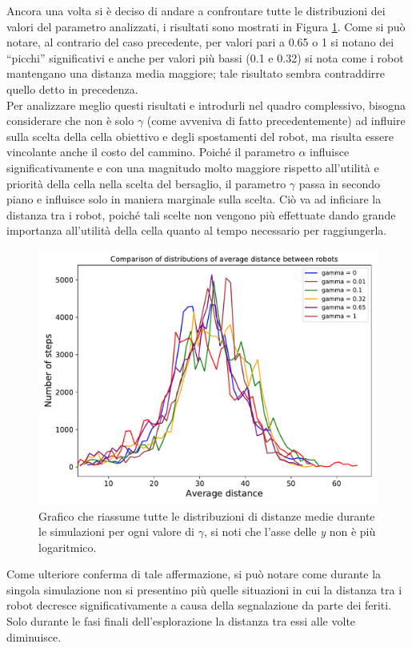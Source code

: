 Ancora una volta si è deciso di andare a confrontare tutte le distribuzioni dei valori del parametro analizzati, i risultati sono mostrati in Figura \ref{fig:gammaHComparison}.
Come si può notare, al contrario del caso precedente, per valori pari a 0.65 o 1 si notano dei “picchi” significativi e anche per valori più bassi (0.1 e 0.32) si nota come i robot mantengano una distanza media maggiore; tale risultato sembra contraddirre quello detto in precedenza.\\
Per analizzare meglio questi risultati e introdurli nel quadro complessivo, bisogna considerare che non è solo $\gamma$ (come avveniva di fatto precedentemente) ad influire sulla scelta della cella obiettivo e degli spostamenti del robot, ma risulta essere vincolante anche il costo del cammino. 
Poiché il parametro $\alpha$ influisce significativamente e con una magnitudo molto maggiore rispetto all'utilità e priorità della cella nella scelta del bersaglio, il parametro $\gamma$ passa in secondo piano e influisce solo in maniera marginale sulla scelta. Ciò va ad inficiare la distanza tra i robot, poiché tali scelte non vengono più effettuate dando grande importanza all'utilità della cella quanto al tempo necessario per raggiungerla.
\begin{figure}
	\centering
	\includegraphics[width=0.9\linewidth]{images/gamma_results/high_alpha/comparison}
	\caption{Grafico che riassume tutte le distribuzioni di distanze medie durante le simulazioni per ogni valore di $\gamma$, si noti che l'asse delle \textit{y} non è più logaritmico.}
	\label{fig:gammaHComparison}
\end{figure}
Come ulteriore conferma di tale affermazione, si può notare come durante la singola simulazione non si presentino più quelle situazioni in cui la distanza tra i robot decresce significativamente a causa della segnalazione da parte dei feriti. Solo durante le fasi finali dell'esplorazione la distanza tra essi alle volte diminuisce.
